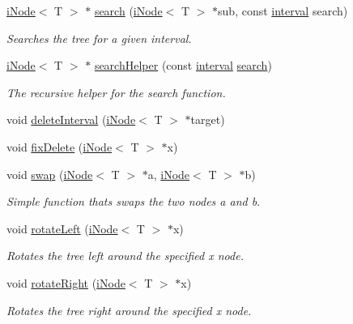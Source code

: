\begin{DoxyCompactItemize}
\hyperlink{classi_node}{i\-Node}$<$ T $>$ $\ast$ \hyperlink{classinterval_tree_ab03b316e6aff3dc635ac7da1f7ebb13f}{search} (\hyperlink{classi_node}{i\-Node}$<$ T $>$ $\ast$sub, const \hyperlink{classinterval}{interval} search)
\begin{DoxyCompactList}\small\item\em Searches the tree for a given interval. \end{DoxyCompactList}\item 
\hyperlink{classi_node}{i\-Node}$<$ T $>$ $\ast$ \hyperlink{classinterval_tree_a27113d930450800c9b1e1a5007acebb4}{search\-Helper} (const \hyperlink{classinterval}{interval} \hyperlink{classinterval_tree_ab03b316e6aff3dc635ac7da1f7ebb13f}{search})
\begin{DoxyCompactList}\small\item\em The recursive helper for the search function. \end{DoxyCompactList}\item 
void \hyperlink{classinterval_tree_ad2b7653fba7f5df9a242e67e86a2876b}{delete\-Interval} (\hyperlink{classi_node}{i\-Node}$<$ T $>$ $\ast$target)
\item 
void \hyperlink{classinterval_tree_aa81787b5ab64d9d3ba1b2f0cf933f98c}{fix\-Delete} (\hyperlink{classi_node}{i\-Node}$<$ T $>$ $\ast$x)
\item 
void \hyperlink{classinterval_tree_ae78c3fec2beba297ab640f0f428e3400}{swap} (\hyperlink{classi_node}{i\-Node}$<$ T $>$ $\ast$a, \hyperlink{classi_node}{i\-Node}$<$ T $>$ $\ast$b)
\begin{DoxyCompactList}\small\item\em Simple function thats swaps the two nodes a and b. \end{DoxyCompactList}\item 
void \hyperlink{classinterval_tree_a7228084b4c5e95fa2b95849f62e4de02}{rotate\-Left} (\hyperlink{classi_node}{i\-Node}$<$ T $>$ $\ast$x)
\begin{DoxyCompactList}\small\item\em Rotates the tree left around the specified x node. \end{DoxyCompactList}\item 
void \hyperlink{classinterval_tree_a1d7597a79aa2d8e24c57d329ac24775e}{rotate\-Right} (\hyperlink{classi_node}{i\-Node}$<$ T $>$ $\ast$x)
\begin{DoxyCompactList}\small\item\em Rotates the tree right around the specified x node. \end{DoxyCompactList}\item 

\end{DoxyCompactItemize}
